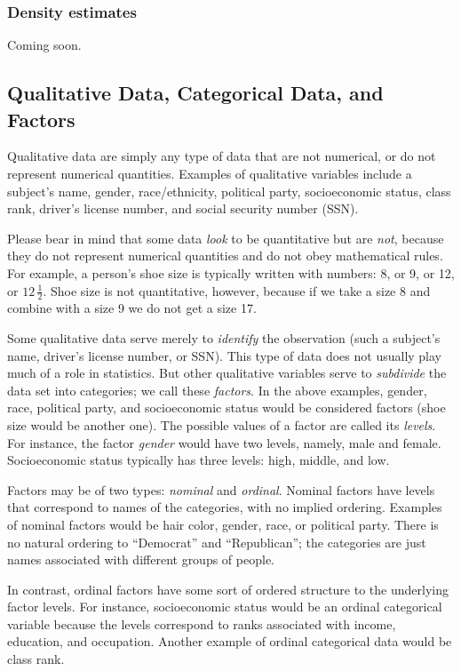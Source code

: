 \documentclass[captions=tableheading]{scrbook}
\begin{document}
\subsubsection{Density estimates}
\label{sec-3-1-2-5}


Coming soon.
\subsection{Qualitative Data, Categorical Data, and Factors}
\label{sec-3-1-3}
\label{sub-Qualitative-Data}


Qualitative data are simply any type of data that are not numerical, or do not represent numerical quantities. Examples of qualitative variables include a subject's name, gender, race/ethnicity, political party, socioeconomic status, class rank, driver's license number, and social security number (SSN).

Please bear in mind that some data \emph{look} to be quantitative but are \emph{not}, because they do not represent numerical quantities and do not obey mathematical rules. For example, a person's shoe size is typically written with numbers: 8, or 9, or 12, or \(12\,\frac{1}{2}\). Shoe size is not quantitative, however, because if we take a size 8 and combine with a size 9 we do not get a size 17.

Some qualitative data serve merely to \emph{identify} the observation (such a subject's name, driver's license number, or SSN). This type of data does not usually play much of a role in statistics. But other qualitative variables serve to \emph{subdivide} the data set into categories; we call these \emph{factors}. In the above examples, gender, race, political party, and socioeconomic status would be considered factors (shoe size would be another one). The possible values of a factor are called its \emph{levels}. For instance, the factor \emph{gender} would have two levels, namely, male and female. Socioeconomic status typically has three levels: high, middle, and low.

Factors may be of two types: \emph{nominal} and \emph{ordinal}. Nominal factors have levels that correspond to names of the categories, with no implied ordering. Examples of nominal factors would be hair color, gender, race, or political party. There is no natural ordering to ``Democrat'' and ``Republican''; the categories are just names associated with different groups of people. 

In contrast, ordinal factors have some sort of ordered structure to the underlying factor levels. For instance, socioeconomic status would be an ordinal categorical variable because the levels correspond to ranks associated with income, education, and occupation. Another example of ordinal categorical data would be class rank.
\end{document}
